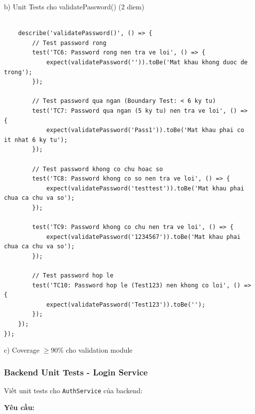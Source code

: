 \documentclass[a4paper,12pt]{article}
\begin{document}
b) Unit Tests cho validatePassword() (2 diem)
\begin{tcolorbox}[breakable, colback=green!5,colframe=black!50,title=validation.test.js]
\begin{lstlisting}

    describe('validatePassword()', () => {
        // Test password rong
        test('TC6: Password rong nen tra ve loi', () => {
            expect(validatePassword('')).toBe('Mat khau khong duoc de trong');
        });

        // Test password qua ngan (Boundary Test: < 6 ky tu)
        test('TC7: Password qua ngan (5 ky tu) nen tra ve loi', () => {
            expect(validatePassword('Pass1')).toBe('Mat khau phai co it nhat 6 ky tu');
        });

        // Test password khong co chu hoac so
        test('TC8: Password khong co so nen tra ve loi', () => {
            expect(validatePassword('testtest')).toBe('Mat khau phai chua ca chu va so');
        });

        test('TC9: Password khong co chu nen tra ve loi', () => {
            expect(validatePassword('1234567')).toBe('Mat khau phai chua ca chu va so');
        });

        // Test password hop le
        test('TC10: Password hop le (Test123) nen khong co loi', () => {
            expect(validatePassword('Test123')).toBe('');
        });
    });
});

\end{lstlisting}
\end{tcolorbox}


c) Coverage $\geq 90\%$ cho validation module



\subsubsection{Backend Unit Tests - Login Service}

Viết unit tests cho \texttt{AuthService} của backend:

\textbf{Yêu cầu:}
\end{document}
